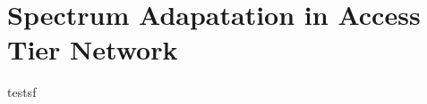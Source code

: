 \chapter{Spectrum Adapatation in Access Tier Network} \label{ch:winmee}


\cite{friis} testsf 


%
%
%
%
